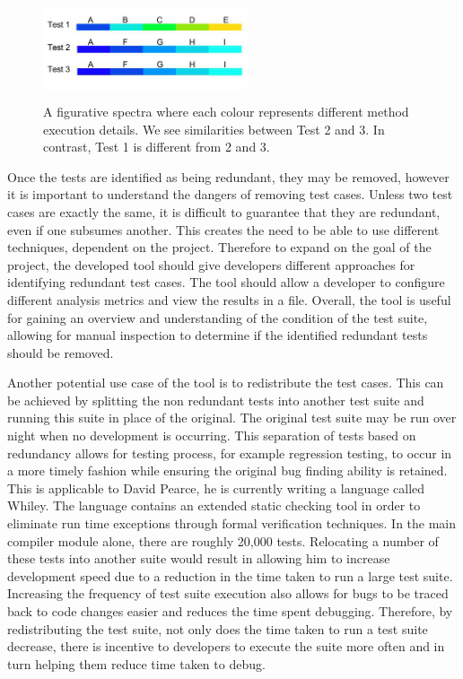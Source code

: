\begin{figure}[h]
\centering
\includegraphics[width=6cm,height=3cm]{spectra.png}
\caption{A figurative spectra where each colour represents different method execution details. We see similarities between Test 2 and 3. In contrast, Test 1 is different from 2 and 3. }
\label{fig:spectra}
\end{figure}

Once the tests are identified as being redundant, they may be removed, however it is important to understand the dangers of removing test cases. Unless two test cases are exactly the same, it is difficult to guarantee that they are redundant, even if one subsumes another. This creates the need to be able to use different techniques, dependent on the project. Therefore to expand on the goal of the project, the developed tool should give developers different approaches for identifying redundant test cases. The tool should allow a developer to configure different analysis metrics and view the results in a file. Overall, the tool is useful for gaining an overview and understanding of the condition of the test suite, allowing for manual inspection to determine if the identified redundant tests should be removed.

Another potential use case of the tool is to redistribute the test cases. This can be achieved by splitting the non redundant tests into another test suite and running this suite in place of the original. The original test suite may be run over night when no development is occurring. This separation of tests based on redundancy allows for testing process, for example regression testing, to occur in a more timely fashion while ensuring the original bug finding ability is retained. This is applicable to David Pearce, he is currently writing a language called Whiley. The language contains an extended static checking tool in order to eliminate run time exceptions through formal verification techniques. In the main compiler module alone, there are roughly 20,000 tests. Relocating a number of these tests into another suite would result in allowing him to increase development speed due to a reduction in the time taken to run a large test suite. Increasing the frequency of test suite execution also allows for bugs to be traced back to code changes easier and reduces the time spent debugging. Therefore, by redistributing the test suite, not only does the time taken to run a test suite decrease, there is incentive to developers to execute the suite more often and in turn helping them reduce time taken to debug.

